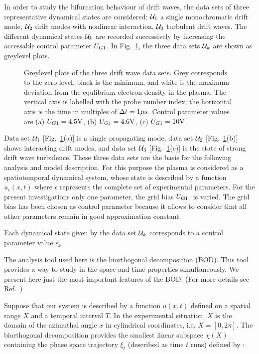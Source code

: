 In order to study the bifurcation behaviour of drift waves,
the data sets of three representative dynamical states are considered: 
${\cal U}_1$ a single monochromatic drift mode, ${\cal U}_2$ drift 
modes with nonlinear interaction, ${\cal U}_3$ turbulent drift waves.
 The 
different dynamical states ${\cal U}_k$ are recorded successively by 
increasing the accessable control parameter $U_{\rm G1}$. 
In Fig.~\ref{data},
the three data sets ${\cal U}_k$ are shown as greylevel plots. 
%
\begin{figure}[htb]
 \caption{Greylevel plots of the three drift wave data sets. Grey 
corresponds
          to the zero level, black is the minimum, and white is the
 maximum 
          deviation from the equlibrium electron density in the plasma. 
The 
          vertical axis is labelled with the probe number index, the 
          horizontal axis is the time in multiples of 
$\Delta t=1\mu{\rm s}$.
          Control parameter values are (a) $U_{G1}=4.5{\rm V}$, (b) 
          $U_{G1}=4.6{\rm V}$, (c) $U_{G1}=10{\rm V}$.}
 \label{data}
\end{figure}
%
Data set ${\cal U}_1$ [Fig.~\ref{data}(a)] is a single propagating mode, 
data set ${\cal U}_2$ [Fig.~\ref{data}(b)] shows interacting drift modes, 
and data set ${\cal U}_3$ [Fig.~\ref{data}(c)] is the state of strong
drift wave turbulence. These three data sets are the basis for the 
following analysis and model description. For this purpose the plasma
is considered as a spatiotemporal dynamical system, whose state is 
described by a function $u_{\epsilon}(x,t)$ where $\epsilon$ represents
the complete set of experimental parameters. 
For the present investigations 
only one parameter, the grid bias $U_{\rm G1}$, is varied. 
The grid bias has been chosen as control parameter
because it allows to consider
that all other parameters remain in good approximation constant.

Each dynamical
state given by the data set ${\cal U}_k$ corresponds to a control 
parameter
value $\epsilon_k$. 

%
%

\medskip
The analysis tool used here is the biorthogonal 
decomposition (BOD). This tool provides a way to study in
 the space and time properties simultaneously. 
We present here just the most important features of the BOD.
(For more details see Ref.~\cite{LimaCom})

Suppose that our system is described by a function $u(x,t)$ defined 
on a spatial range $X$ and a temporal interval $T$.
In the experimental situation, $X$ is the domain of the azimuthal 
angle $x$ in cylindrical coordinates, i.e. $X=[0,2\pi]$. 
The biorthogonal decomposition provides the smallest linear 
subspace $\chi(X)$ containing the phase space trajectory
$\xi_t$ (described as time $t$ runs) defined by :

